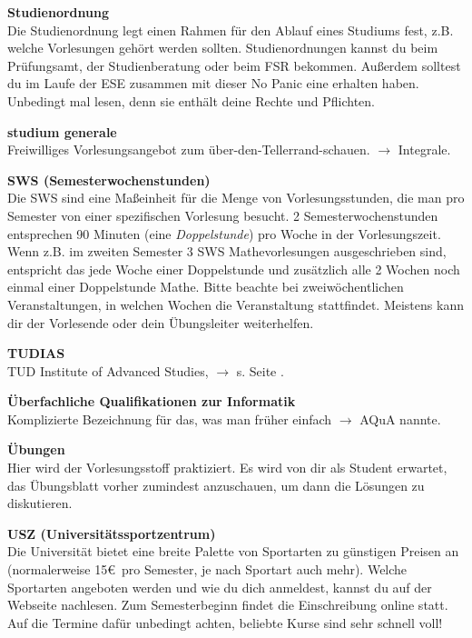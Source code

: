 \begin{multicols}{2}

\textbf{Studienordnung} \\
Die Studienordnung legt einen Rahmen für den Ablauf eines Studiums fest, z.B. welche Vorlesungen gehört werden sollten.
Studienordnungen kannst du beim Prüfungsamt, der Studienberatung oder beim FSR bekommen.
Außerdem solltest du im Laufe der ESE zusammen mit dieser No Panic eine erhalten haben.
Unbedingt mal lesen, denn sie enthält deine Rechte und Pflichten.

\textbf{studium generale} \\
Freiwilliges Vorlesungsangebot zum über-den-Tellerrand-schauen.
$\rightarrow$ Integrale.

\textbf{SWS (Semesterwochenstunden)} \\
Die SWS sind eine Maßeinheit für die Menge von Vorlesungsstunden, die man pro Semester von einer spezifischen Vorlesung besucht.
2 Semesterwochenstunden entsprechen 90 Minuten (eine \emph{Doppelstunde}) pro Woche in der Vorlesungszeit.
Wenn z.B. im zweiten Semester 3 SWS Mathevorlesungen ausgeschrieben sind, entspricht das jede Woche einer Doppelstunde und zusätzlich alle 2 Wochen noch einmal einer Doppelstunde Mathe.
Bitte beachte bei zweiwöchentlichen Veranstaltungen, in welchen Wochen die Veranstaltung stattfindet. Meistens kann dir der Vorlesende oder dein Übungsleiter weiterhelfen.

\textbf{TUDIAS} \\
TUD Institute of Advanced Studies, $\rightarrow$ s. Seite \pageref{sec:sprachausbildung}.

\textbf{Überfachliche Qualifikationen zur Informatik} \\
Komplizierte Bezeichnung für das, was man früher einfach $\rightarrow$ AQuA nannte.

\textbf{Übungen} \\
Hier wird der Vorlesungsstoff praktiziert.
Es wird von dir als Student erwartet, das Übungsblatt vorher zumindest anzuschauen, um dann die Lösungen zu diskutieren.

\textbf{USZ (Universitätssportzentrum)} \\
Die Universität bietet eine breite Palette von Sportarten zu günstigen Preisen an (normalerweise 15\euro\ pro Semester, je nach Sportart auch mehr).
Welche Sportarten angeboten werden und wie du dich anmeldest, kannst du auf der Webseite  nachlesen.
Zum Semesterbeginn findet die Einschreibung online statt.
Auf die Termine dafür unbedingt achten, beliebte Kurse sind sehr schnell voll!


\end{multicols}
